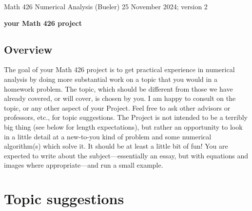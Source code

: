 \documentclass[11pt]{amsart}
\begin{document}
\scriptsize \noindent Math 426 Numerical Analysis (Bueler) \hfill {\color{BrickRed} 25 November 2024; version 2}
\bigskip

\Large\centerline{\textbf{your Math 426 project}}
\normalsize

\thispagestyle{empty}

\bigskip

\subsection*{Overview}  The goal of your Math 426 project is to get practical experience in numerical analysis by doing more substantial work on a topic that you would in a homework problem.  The topic, which should be different from those we have already covered, or will cover, is chosen by you.  I am happy to consult on the topic, or any other aspect of your Project.  Feel free to ask other advisors or professors, etc., for topic suggestions.  The Project is not intended to be a terribly big thing (see below for length expectations), but rather an opportunity to look in a little detail at a new-to-you kind of problem and some numerical algorithm(s) which solve it.  It should be at least a little bit of fun!  You are expected to write about the subject---essentially an essay, but with equations and images where appropriate---and run a small example.

\section*{Topic suggestions}
\end{document}
